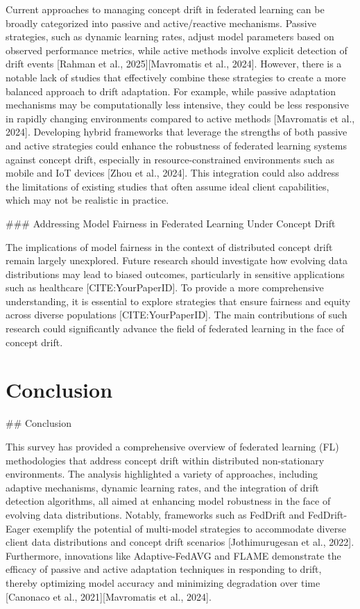 \documentclass[journal]{IEEEtran}
\begin{document}
Current approaches to managing concept drift in federated learning can be broadly categorized into passive and active/reactive mechanisms. Passive strategies, such as dynamic learning rates, adjust model parameters based on observed performance metrics, while active methods involve explicit detection of drift events [Rahman et al., 2025][Mavromatis et al., 2024]. However, there is a notable lack of studies that effectively combine these strategies to create a more balanced approach to drift adaptation. For example, while passive adaptation mechanisms may be computationally less intensive, they could be less responsive in rapidly changing environments compared to active methods [Mavromatis et al., 2024]. Developing hybrid frameworks that leverage the strengths of both passive and active strategies could enhance the robustness of federated learning systems against concept drift, especially in resource-constrained environments such as mobile and IoT devices [Zhou et al., 2024]. This integration could also address the limitations of existing studies that often assume ideal client capabilities, which may not be realistic in practice.

\#\#\# Addressing Model Fairness in Federated Learning Under Concept Drift

The implications of model fairness in the context of distributed concept drift remain largely unexplored. Future research should investigate how evolving data distributions may lead to biased outcomes, particularly in sensitive applications such as healthcare [CITE:YourPaperID]. To provide a more comprehensive understanding, it is essential to explore strategies that ensure fairness and equity across diverse populations [CITE:YourPaperID]. The main contributions of such research could significantly advance the field of federated learning in the face of concept drift.

\section{Conclusion}
\label{sec:conclusion}

\#\# Conclusion

This survey has provided a comprehensive overview of federated learning (FL) methodologies that address concept drift within distributed non-stationary environments. The analysis highlighted a variety of approaches, including adaptive mechanisms, dynamic learning rates, and the integration of drift detection algorithms, all aimed at enhancing model robustness in the face of evolving data distributions. Notably, frameworks such as FedDrift and FedDrift-Eager exemplify the potential of multi-model strategies to accommodate diverse client data distributions and concept drift scenarios [Jothimurugesan et al., 2022]. Furthermore, innovations like Adaptive-FedAVG and FLAME demonstrate the efficacy of passive and active adaptation techniques in responding to drift, thereby optimizing model accuracy and minimizing degradation over time [Canonaco et al., 2021][Mavromatis et al., 2024].
\end{document}
